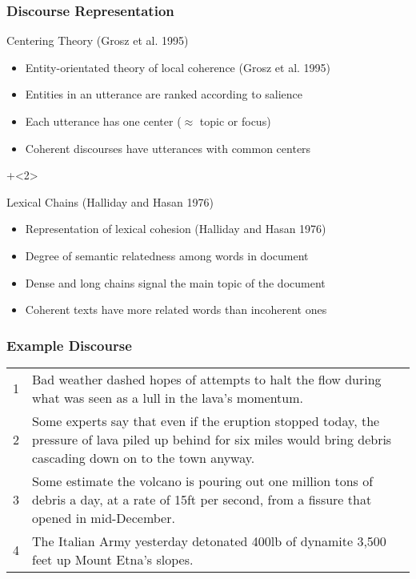 \documentclass{beamer}
\begin{document}
\begin{frame}
  \frametitle{Discourse Representation}

\begin{block}{Centering Theory (Grosz et al. 1995)}
  \begin{itemize}
    \item Entity-orientated theory of local coherence (Grosz et al. 1995)
    \item \alert{Entities} in an \alert{utterance} are ranked according to
      salience
    \item Each utterance has one \alert{center} ($\approx$  topic or focus)
    \item Coherent discourses have utterances with  common centers
    \end{itemize}
\end{block}

\onslide+<2>{
\begin{block}{Lexical Chains (Halliday and Hasan 1976)}
\begin{itemize}
  \item Representation of lexical cohesion  (Halliday and Hasan 1976)
  \item Degree of \alert{semantic relatedness} among words in document
  \item \alert{Dense} and \alert{long} chains signal the main topic of
    the document
  \item Coherent texts have more  related words than
    incoherent ones
  \end{itemize}
\end{block}
}
\end{frame}



\begin{frame}
  \frametitle{Example Discourse}
  \begin{exampleblock}{}
    \begin{center}
     \begin{tabularx}{\textwidth}{l@{\hspace{0.5em}}X}
1&   Bad weather dashed hopes of attempts to halt the flow during
      what was seen as a lull in the lava's momentum. \\
2 &  Some experts say that even if the eruption stopped today, the
      pressure of lava piled up behind for six miles would bring
      debris cascading down on to the town anyway. \\
3 &  Some estimate the volcano is pouring out one million tons of
      debris a day, at a rate of 15ft per second, from a fissure that
      opened in mid-December. \\
4&   The Italian Army yesterday detonated 400lb of dynamite
      3,500 feet up Mount Etna's slopes. \\
    \end{tabularx}
    \end{center}
  \end{exampleblock}
\end{frame}
\end{document}
